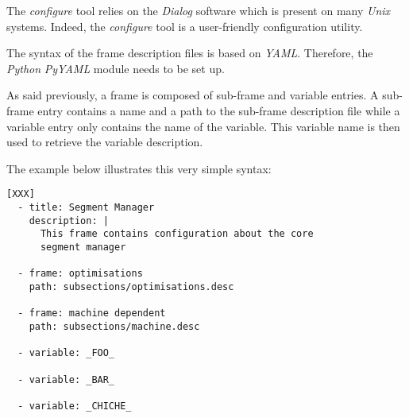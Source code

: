 

The \textit{configure} tool relies on the \textit{Dialog} software which
is present on many \textit{Unix} systems. Indeed, the \textit{configure}
tool is a user-friendly configuration utility.



The syntax of the frame description files is based on \textit{YAML}. Therefore,
the \textit{Python} \textit{PyYAML} module needs to be set up.

As said previously, a frame is composed of sub-frame and variable entries. A
sub-frame entry contains a name and a path to the sub-frame description file
while a variable entry only contains the name of the variable. This variable
name is then used to retrieve the variable description.

The example below illustrates this very simple syntax:

\begin{verbatim}
[XXX]
  - title: Segment Manager
    description: |
      This frame contains configuration about the core
      segment manager

  - frame: optimisations
    path: subsections/optimisations.desc

  - frame: machine dependent
    path: subsections/machine.desc

  - variable: _FOO_

  - variable: _BAR_

  - variable: _CHICHE_
\end{verbatim}
